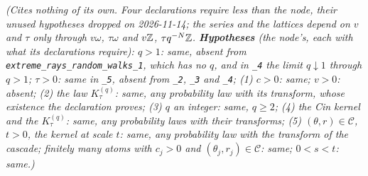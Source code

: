 \begin{proposition}
\statusT\quad\emph{(Cites nothing of its own. Four declarations require less than the node, their
unused hypotheses dropped on 2026-11-14; the series and the lattices depend on $v$ and $\tau$ only
through $v\omega$, $\tau\omega$ and $v\mathbb{Z}$, $\tau q^{-N}\mathbb{Z}$. \textbf{Hypotheses} (the node's, each
with what its declarations require): $q > 1$: same, absent from \texttt{extreme\_rays\_random\_walks\_1},
which has no $q$, and in \texttt{\_4} the limit $q \downarrow 1$ through $q > 1$; $\tau > 0$: same
in \texttt{\_5}, absent from \texttt{\_2}, \texttt{\_3} and \texttt{\_4}; (1) $c > 0$: same;
$v > 0$: absent; (2) the law $K^{(q)}_\tau$: same, any probability law with its transform, whose
existence the declaration proves; (3) $q$ an integer: same, $q \ge 2$; (4) the Cin kernel and the
$K^{(q)}_\tau$: same, any probability laws with their transforms; (5) $(\theta, r) \in
\mathcal{C}$, $t > 0$, the kernel at scale $t$: same, any probability law with the transform of the
cascade; finitely many atoms with $c_j > 0$ and $(\theta_j, r_j) \in \mathcal{C}$: same;
$0 < s < t$: same.)}
\end{proposition}

